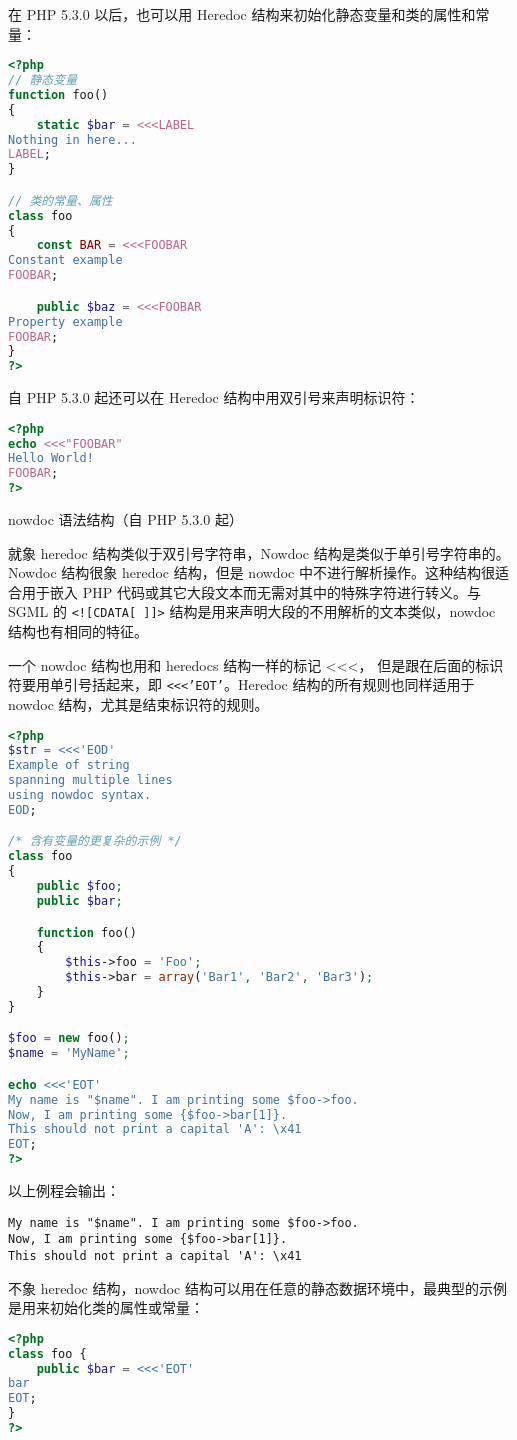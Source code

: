 \begin{compactitem}
在 PHP 5.3.0 以后，也可以用 Heredoc 结构来初始化静态变量和类的属性和常量：

\begin{lstlisting}[language=PHP]
<?php
// 静态变量
function foo()
{
    static $bar = <<<LABEL
Nothing in here...
LABEL;
}

// 类的常量、属性
class foo
{
    const BAR = <<<FOOBAR
Constant example
FOOBAR;

    public $baz = <<<FOOBAR
Property example
FOOBAR;
}
?>
\end{lstlisting}

自 PHP 5.3.0 起还可以在 Heredoc 结构中用双引号来声明标识符：

\begin{lstlisting}[language=PHP]
<?php
echo <<<"FOOBAR"
Hello World!
FOOBAR;
?>
\end{lstlisting}

\item nowdoc 语法结构（自 PHP 5.3.0 起）

就象 heredoc 结构类似于双引号字符串，Nowdoc 结构是类似于单引号字符串的。Nowdoc 结构很象 heredoc 结构，但是 nowdoc 中不进行解析操作。这种结构很适合用于嵌入 PHP 代码或其它大段文本而无需对其中的特殊字符进行转义。与 SGML 的 \texttt{<![CDATA[ ]]>} 结构是用来声明大段的不用解析的文本类似，nowdoc 结构也有相同的特征。

一个 nowdoc 结构也用和 heredocs 结构一样的标记 <<<， 但是跟在后面的标识符要用单引号括起来，即 \texttt{<\/<\/<'EOT'}。Heredoc 结构的所有规则也同样适用于 nowdoc 结构，尤其是结束标识符的规则。

\begin{lstlisting}[language=PHP]
<?php
$str = <<<'EOD'
Example of string
spanning multiple lines
using nowdoc syntax.
EOD;

/* 含有变量的更复杂的示例 */
class foo
{
    public $foo;
    public $bar;

    function foo()
    {
        $this->foo = 'Foo';
        $this->bar = array('Bar1', 'Bar2', 'Bar3');
    }
}

$foo = new foo();
$name = 'MyName';

echo <<<'EOT'
My name is "$name". I am printing some $foo->foo.
Now, I am printing some {$foo->bar[1]}.
This should not print a capital 'A': \x41
EOT;
?>
\end{lstlisting}

以上例程会输出：

\begin{verbatim}
My name is "$name". I am printing some $foo->foo.
Now, I am printing some {$foo->bar[1]}.
This should not print a capital 'A': \x41
\end{verbatim}

不象 heredoc 结构，nowdoc 结构可以用在任意的静态数据环境中，最典型的示例是用来初始化类的属性或常量：

\begin{lstlisting}[language=PHP]
<?php
class foo {
    public $bar = <<<'EOT'
bar
EOT;
}
?>
\end{lstlisting}

\end{compactitem}


